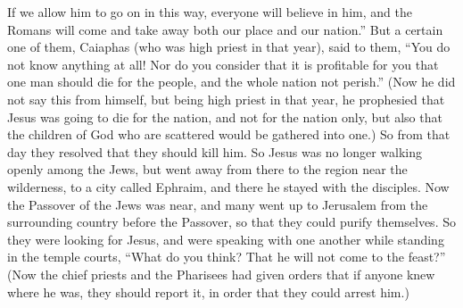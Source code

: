 \begin{biblechapter}
\verse If we allow him to go on in this way, everyone will believe in him, and the Romans will come and take away both our place and our nation.”
\verse But a certain one of them, Caiaphas (who was high priest in that year), said to them, “You do not know anything at all!
\verse Nor do you consider that it is profitable for you that one man should die for the people, and the whole nation not perish.”
\verse (Now he did not say this from himself, but being high priest in that year, he prophesied that Jesus was going to die for the nation,
\verse and not for the nation only, but also that the children of God who are scattered would be gathered into one.)
\verse So from that day they resolved that they should kill him.
\verse So Jesus was no longer walking openly among the Jews, but went away from there to the region near the wilderness, to a city called Ephraim, and there he stayed with the disciples.
\verse Now the Passover of the Jews was near, and many went up to Jerusalem from the surrounding country before the Passover, so that they could purify themselves.
\verse So they were looking for Jesus, and were speaking with one another while standing in the temple courts, “What do you think? That he will not come to the feast?”
\verse (Now the chief priests and the Pharisees had given orders that if anyone knew where he was, they should report it, in order that they could arrest him.)
\end{biblechapter}

